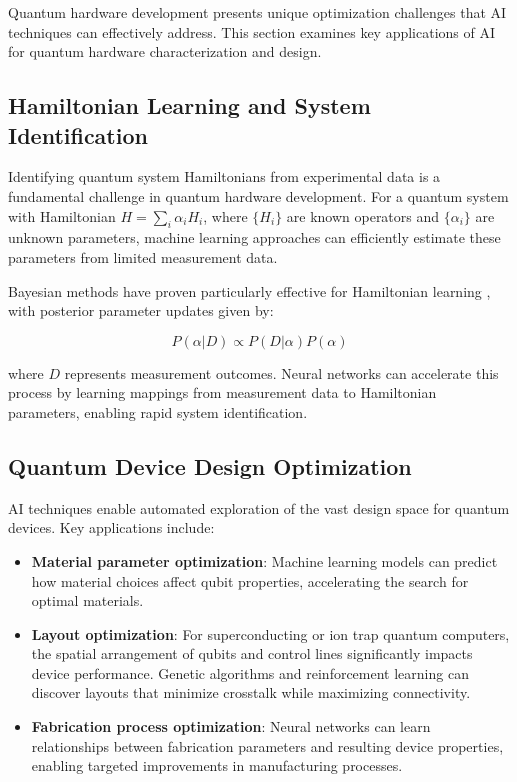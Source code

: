 Quantum hardware development presents unique optimization challenges that AI techniques can effectively address. This section examines key applications of AI for quantum hardware characterization and design.

\subsection{Hamiltonian Learning and System Identification}
Identifying quantum system Hamiltonians from experimental data is a fundamental challenge in quantum hardware development. For a quantum system with Hamiltonian $H = \sum_i \alpha_i H_i$, where $\{H_i\}$ are known operators and $\{\alpha_i\}$ are unknown parameters, machine learning approaches can efficiently estimate these parameters from limited measurement data.

Bayesian methods have proven particularly effective for Hamiltonian learning \cite{wiebe2014hamiltonian}, with posterior parameter updates given by:

\begin{equation}
P(\alpha | D) \propto P(D | \alpha) P(\alpha)
\end{equation}

where $D$ represents measurement outcomes. Neural networks can accelerate this process by learning mappings from measurement data to Hamiltonian parameters, enabling rapid system identification.

\subsection{Quantum Device Design Optimization}
AI techniques enable automated exploration of the vast design space for quantum devices. Key applications include:

\begin{itemize}
    \item \textbf{Material parameter optimization}: Machine learning models can predict how material choices affect qubit properties, accelerating the search for optimal materials.
    
    \item \textbf{Layout optimization}: For superconducting or ion trap quantum computers, the spatial arrangement of qubits and control lines significantly impacts device performance. Genetic algorithms and reinforcement learning can discover layouts that minimize crosstalk while maximizing connectivity.
    
    \item \textbf{Fabrication process optimization}: Neural networks can learn relationships between fabrication parameters and resulting device properties, enabling targeted improvements in manufacturing processes.
\end{itemize}

